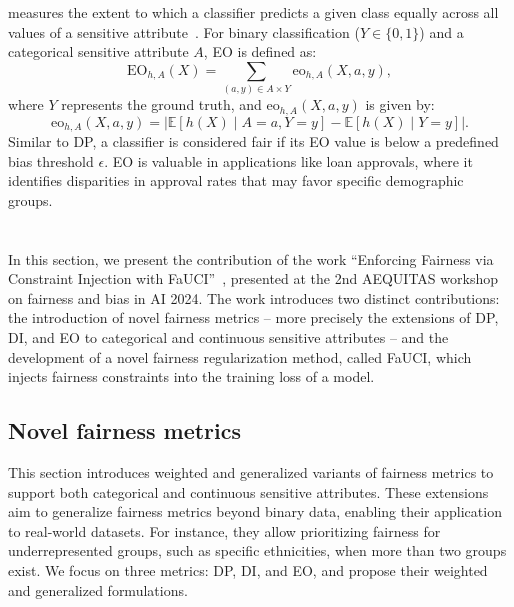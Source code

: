  measures the extent to which a classifier predicts a given class equally across all values of a sensitive attribute~\cite{DBLP:conf/nips/HardtPNS16}.
%
For binary classification (\( Y \in \{0, 1\} \)) and a categorical sensitive attribute \( A \), \gls{EO} is defined as:
%
\begin{equation}
    \label{eq:eo}
    \text{EO}_{h,A}(X) = \sum_{(a, y) \in A \times Y} \text{eo}_{h,A}(X, a, y),
\end{equation}
%
where \( Y \) represents the ground truth, and \( \text{eo}_{h,A}(X, a, y) \) is given by:
%
\begin{equation}
    \label{eq:eo_partial}
    \text{eo}_{h,A}(X, a, y) = \left| \mathbb{E}[h(X) \mid A = a, Y = y] - \mathbb{E}[h(X) \mid Y = y] \right|.
\end{equation}
%
Similar to \gls{DP}, a classifier is considered fair if its \gls{EO} value is below a predefined bias threshold \( \epsilon \).
%
\Gls{EO} is valuable in applications like loan approvals, where it identifies disparities in approval rates that may favor specific demographic groups.




\section[Fairness under constraints injection]{}\label{sec:fauci}
%
In this section, we present the contribution of the work ``Enforcing Fairness via Constraint Injection with FaUCI''~\cite{DBLP:conf/aequitas/MagniniCCO24}, presented at the 2nd AEQUITAS workshop on fairness and bias in \gls{AI} 2024.
%
The work introduces two distinct contributions: the introduction of novel fairness metrics -- more precisely the extensions of \gls{DP}, \gls{DI}, and \gls{EO} to categorical and continuous sensitive attributes -- and the development of a novel fairness regularization method, called \gls{FaUCI}, which injects fairness constraints into the training loss of a model.


\subsection{Novel fairness metrics}\label{subsec:novel-fairness-metrics}
%
This section introduces weighted and generalized variants of fairness metrics to support both categorical and continuous sensitive attributes.
%
These extensions aim to generalize fairness metrics beyond binary data, enabling their application to real-world datasets.
%
For instance, they allow prioritizing fairness for underrepresented groups, such as specific ethnicities, when more than two groups exist.
%
We focus on three metrics: \gls{DP}, \gls{DI}, and \gls{EO}, and propose their weighted and generalized formulations.


